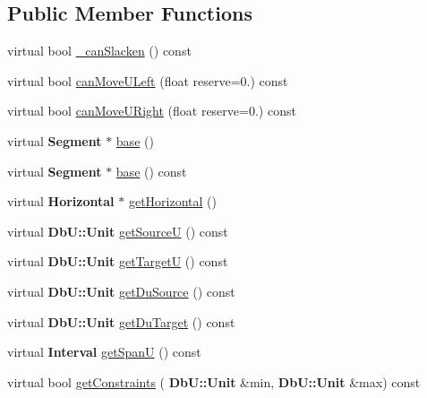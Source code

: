 \subsection*{Public Member Functions}
\begin{DoxyCompactItemize}
\item 
virtual bool \mbox{\hyperlink{classKatabatic_1_1AutoHorizontal_a2ced98fb06f208aa88c0962a706e64db}{\+\_\+can\+Slacken}} () const
\item 
virtual bool \mbox{\hyperlink{classKatabatic_1_1AutoHorizontal_a9b0c21eeb26c256876592ba63438da74}{can\+Move\+U\+Left}} (float reserve=0.) const
\item 
virtual bool \mbox{\hyperlink{classKatabatic_1_1AutoHorizontal_ad0c972e34d6bac47bd9276a7d6e053d8}{can\+Move\+U\+Right}} (float reserve=0.) const
\item 
virtual \textbf{ Segment} $\ast$ \mbox{\hyperlink{classKatabatic_1_1AutoHorizontal_a9e651c17b47f82166a02865c9296a2df}{base}} ()
\item 
virtual \textbf{ Segment} $\ast$ \mbox{\hyperlink{classKatabatic_1_1AutoHorizontal_a6f14a3faa93f2c610ea0d2cc7d903706}{base}} () const
\item 
virtual \textbf{ Horizontal} $\ast$ \mbox{\hyperlink{classKatabatic_1_1AutoHorizontal_a659b8ed90de679564924afe07af478de}{get\+Horizontal}} ()
\item 
virtual \textbf{ Db\+U\+::\+Unit} \mbox{\hyperlink{classKatabatic_1_1AutoHorizontal_ad521ffba761b0e81b7b81b99d62f76f9}{get\+SourceU}} () const
\item 
virtual \textbf{ Db\+U\+::\+Unit} \mbox{\hyperlink{classKatabatic_1_1AutoHorizontal_a4d52a506cd19dfa8e22e1dc0695bd960}{get\+TargetU}} () const
\item 
virtual \textbf{ Db\+U\+::\+Unit} \mbox{\hyperlink{classKatabatic_1_1AutoHorizontal_a760500b1fd027c71f5362dd8c0b01ea7}{get\+Du\+Source}} () const
\item 
virtual \textbf{ Db\+U\+::\+Unit} \mbox{\hyperlink{classKatabatic_1_1AutoHorizontal_a76e349c14c904b3300a15caa1ee8b680}{get\+Du\+Target}} () const
\item 
virtual \textbf{ Interval} \mbox{\hyperlink{classKatabatic_1_1AutoHorizontal_a0b5ac47ab175815e1a9bc07f2517614a}{get\+SpanU}} () const
\item 
virtual bool \mbox{\hyperlink{classKatabatic_1_1AutoHorizontal_a16737e7f2b77f8595fd2b607fac0f2f5}{get\+Constraints}} (\textbf{ Db\+U\+::\+Unit} \&min, \textbf{ Db\+U\+::\+Unit} \&max) const
\item 

\end{DoxyCompactItemize}
